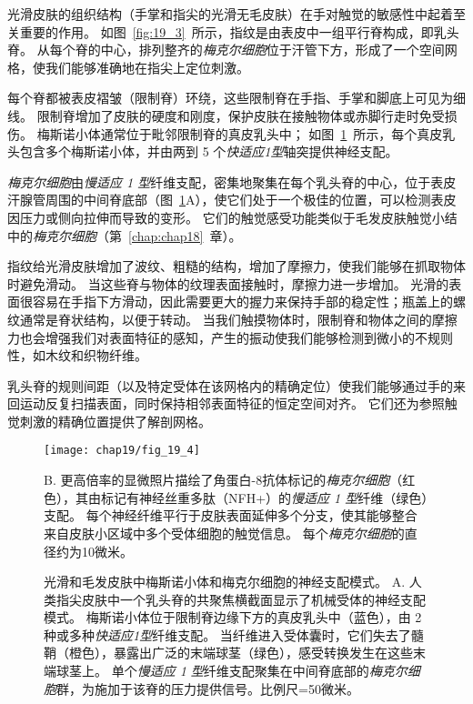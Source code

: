 \begin{proposition}[指纹结构提高了手部的触觉敏感性] \label{box:19_1}
	
	\quad \quad 光滑皮肤的组织结构（手掌和指尖的光滑无毛皮肤）在手对触觉的敏感性中起着至关重要的作用。
	如图~\ref{fig:19_3}~所示，指纹是由表皮中一组平行脊构成，即乳头脊。
	从每个脊的中心，排列整齐的\textit{梅克尔细胞}位于汗管下方，形成了一个空间网格，使我们能够准确地在指尖上定位刺激。
	
	\quad \quad 每个脊都被表皮褶皱（限制脊）环绕，这些限制脊在手指、手掌和脚底上可见为细线。
	限制脊增加了皮肤的硬度和刚度，保护皮肤在接触物体或赤脚行走时免受损伤。
	梅斯诺小体通常位于毗邻限制脊的真皮乳头中；
	如图~\ref{fig:19_4}~所示，每个真皮乳头包含多个梅斯诺小体，并由两到 5 个\textit{快适应1型}轴突提供神经支配。
	
	\quad \quad \textit{梅克尔细胞}由\textit{慢适应 1 型}纤维支配，密集地聚集在每个乳头脊的中心，位于表皮汗腺管周围的中间脊底部（图~\ref{fig:19_4}A），使它们处于一个极佳的位置，可以检测表皮因压力或侧向拉伸而导致的变形。
	它们的触觉感受功能类似于毛发皮肤触觉小结中的\textit{梅克尔细胞}（第~\ref{chap:chap18}~章）。
	
	\quad \quad 指纹给光滑皮肤增加了波纹、粗糙的结构，增加了摩擦力，使我们能够在抓取物体时避免滑动。
	当这些脊与物体的纹理表面接触时，摩擦力进一步增加。
	光滑的表面很容易在手指下方滑动，因此需要更大的握力来保持手部的稳定性；瓶盖上的螺纹通常是脊状结构，以便于转动。
	当我们触摸物体时，限制脊和物体之间的摩擦力也会增强我们对表面特征的感知，产生的振动使我们能够检测到微小的不规则性，如木纹和织物纤维。
	
	\quad \quad 乳头脊的规则间距（以及特定受体在该网格内的精确定位）使我们能够通过手的来回运动反复扫描表面，同时保持相邻表面特征的恒定空间对齐。
	它们还为参照触觉刺激的精确位置提供了解剖网格。
	
\end{proposition}


\begin{figure}[htbp]
	\centering
	\texttt{[image: chap19/fig\_19\_4]}
	\caption{光滑和毛发皮肤中梅斯诺小体和梅克尔细胞的神经支配模式。
		A. 人类指尖皮肤中一个乳头脊的共聚焦横截面显示了机械受体的神经支配模式。
		梅斯诺小体位于限制脊边缘下方的真皮乳头中（蓝色），由 2 种或多种\textit{快适应1型}纤维支配。
		当纤维进入受体囊时，它们失去了髓鞘（橙色），暴露出广泛的末端球茎（绿色），感受转换发生在这些末端球茎上。
		单个\textit{慢适应 1 型}纤维支配聚集在中间脊底部的\textit{梅克尔细胞}群，为施加于该脊的压力提供信号。比例尺=50微米。}
		B. 更高倍率的显微照片描绘了角蛋白-8抗体标记的\textit{梅克尔细胞}（红色），其由标记有神经丝重多肽（NFH+）的\textit{慢适应 1 型}纤维（绿色）支配。
		每个神经纤维平行于皮肤表面延伸多个分支，使其能够整合来自皮肤小区域中多个受体细胞的触觉信息。
		每个\textit{梅克尔细胞}的直径约为10微米。
	\label{fig:19_4}
\end{figure}


